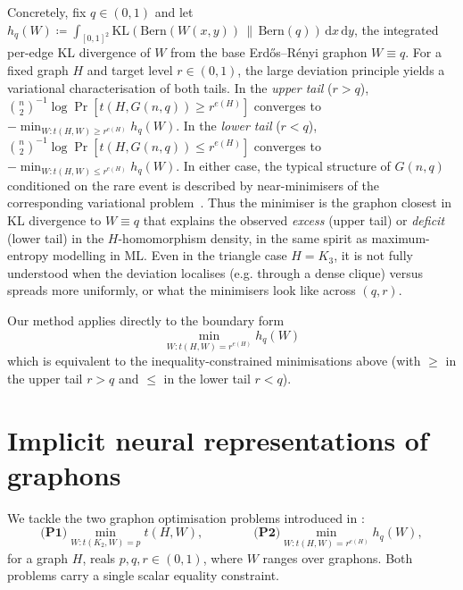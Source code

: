 \documentclass{article}
\theoremstyle{plain}
\theoremstyle{definition}
\theoremstyle{remark}
\begin{document}
Concretely, fix $q \in (0,1)$ and let $h_q(W) \coloneqq \int_{[0,1]^2} \mathrm{KL}(\mathrm{Bern}(W(x,y))\,\|\,\mathrm{Bern}(q))\,\mathrm{d}x\,\mathrm{d}y$, the integrated per-edge KL divergence of $W$ from the base Erd\H{o}s--R\'enyi graphon $W \equiv q$.
For a fixed graph $H$ and target level $r \in (0,1)$, the large deviation principle yields a variational characterisation of both tails.
In the \emph{upper tail} ($r > q$), $\binom{n}{2}^{-1}\log\Pr[t(H, G(n,q)) \ge r^{e(H)}]$ converges to $-\min_{W: t(H,W) \ge r^{e(H)}} h_q(W)$.
In the \emph{lower tail} ($r < q$), $\binom{n}{2}^{-1}\log\Pr[t(H, G(n,q)) \le r^{e(H)}]$ converges to $-\min_{W: t(H,W) \le r^{e(H)}} h_q(W)$.
In either case, the typical structure of $G(n,q)$ conditioned on the rare event is described by near-minimisers of the corresponding variational problem~\citep{lubetzky2015replica}.
Thus the minimiser is the graphon closest in KL divergence to $W \equiv q$ that explains the observed \emph{excess} (upper tail) or \emph{deficit} (lower tail) in the $H$-homomorphism density, in the same spirit as maximum-entropy modelling in ML\@.
Even in the triangle case $H = K_3$, it is not fully understood when the deviation localises (e.g. through a dense clique) versus spreads more uniformly, or what the minimisers look like across $(q,r)$.

Our method applies directly to the boundary form
\begin{equation}
\label{eqn:large-deviation-problem}
  \min_{W : t(H,W) = r^{e(H)}} h_q(W)
\end{equation}
which is equivalent to the inequality-constrained minimisations above (with $\ge$ in the upper tail $r>q$ and $\le$ in the lower tail $r<q$).

\section{Implicit neural representations of graphons} \label{sec:method}

We tackle the two graphon optimisation problems introduced in :
\begin{equation}
\textbf{(P1)} \min_{W : t(K_2, W) = p}  t(H, W),
\qquad\qquad
\textbf{(P2)} \min_{W : t(H, W) = r^{e(H)}} h_q(W),
\label{eqn:targetproblems}
\end{equation}
for a graph $H$, reals $p,q,r \in (0,1)$, where $W$ ranges over graphons. Both problems carry a single scalar equality constraint.
\end{document}

